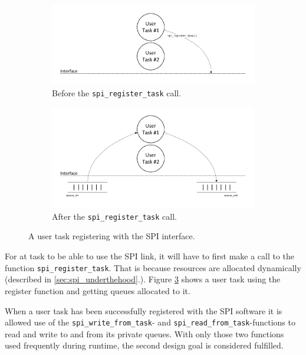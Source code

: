 \begin{figure}[htb]
  \begin{subfigure}[b]{0.495\textwidth}
    \centering
    \includegraphics[width=\textwidth,clip,trim=12 -46 12 0]{content/04_communication/figures/spi_task_diagram_initial_1.pdf}
    \caption{Before the \texttt{spi\_register\_task} call.}
    \label{fig:spi_task_diagram_initial_1}
  \end{subfigure}
  \begin{subfigure}[b]{0.495\textwidth}
    \centering
    \includegraphics[width=\textwidth,clip,trim=12 0 12 0]{content/04_communication/figures/spi_task_diagram_initial_2.pdf}
    \caption{After the \texttt{spi\_register\_task} call.}
    \label{fig:spi_task_diagram_initial_2}
  \end{subfigure}
  \caption{A user task registering with the SPI interface.}
  \label{fig:spi_register_task}
\end{figure}%

For at task to be able to use the SPI link, it will have to first make a call to the function \texttt{spi\_register\_task}. That is because resources are allocated dynamically (described in \ref{sec:spi_underthehood}.). Figure \ref{fig:spi_register_task} shows a user task using the register function and getting queues allocated to it. 

When a user task has been successfully registered with the SPI software it is allowed use of the \texttt{spi\_write\_from\_task}- and \texttt{spi\_read\_from\_task}-functions to read and write to and from its private queues. With only those two functions used frequently during runtime, the second design goal is considered fulfilled.

